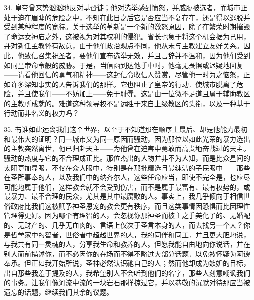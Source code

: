 34. 皇帝曾来势汹汹地反对基督徒；他对选举感到愤怒，并威胁被选者，而城市正处于迫在眉睫的危险之中，不知在此日之后它是否应当不复存在，还是得以逃脱并受到某种程度的宽待。关于选举的革新是一个新的激怒原因，除了在繁荣时期摧毁了命运女神庙之外，这被视为对其权利的侵犯。省长也急于将这个机会据为己用，并对新任主教怀有敌意，由于他们政治观点不同，他从未与主教建立友好关系。因此，他致信召集祝圣者，要他们宣布选举无效，并且言辞并不温和，因为他们受到如同皇帝命令般的威胁。于是，当信函到达他手中时，他毫无畏惧或迟疑地回复——请看他回信的勇气和精神——这封信令收信人赞赏，尽管他一时为之恼怒，正如许多深知事实的人告诉我们的那样。它也阻止了皇帝的行动，使城市脱离了危险，并且使我们——不妨加上——免于耻辱。这是由一位微不足道且属于辅助教区的主教所成就的。难道这种领导权不是远胜于来自上级教区的头衔，以及一种基于行动而非名义的权力吗？\par

35. 有谁如此远离我们这个世界，以至于不知道那在顺序上最后、却是他能力最初和最伟大的证明？同一城市又为同一原因而骚动，因为那位以如此光荣的暴力选出的主教突然离世，他已归赴天主——为他曾在迫害中勇敢而高贵地奋战过的天主。骚动的热度与它的不合理成正比。那位杰出的人物并非不为人知，而是比众星间的太阳更加显眼，不仅在众人眼中，特别是在那批精选且最纯洁的子民眼中——那些在圣所事奉的人，以及我们中的纳齐尔人，这些任命应当，即使不完全是，也应尽可能地属于他们，这样教会就不会受到伤害，而不是属于最富有、最有权势的，或最暴力、最不合理的民众，尤其是其中最腐败的人。事实上，我几乎倾向于相信世俗政府比我们这被赋予神圣恩宠的教会更有秩序，而且这类事情因恐惧而比因理性管理得更好。因为哪个有理智的人，会忽视你那神圣而被主之手美化了的、无婚配的、无财产的、几乎无血肉的、言语上仅次于圣言本身的人，而去找另一个人？你是哲学家中的智者，世俗者中超越世界的人，我的同伴和同工，并且更大胆地说，与我共有同一灵魂的人，分享我生命和教养的人。但愿我能自由地向你说话，并在别人面前描述你，而不必因你的在场而不得不略过大部分话题，以免被怀疑为阿谀奉承。但正如我开始所说，圣神必然认识祂自己的人；然而他却成为嫉妒的目标，出自那些我羞于提及的人，我希望别人不会听到他们的名字，那些人刻意嘲讽我们的事务。让我们像河流中流的一块岩石那样掠过它，并以恭敬的沉默对待那应当被遗忘的话题，继续我们其余的议题。\par

